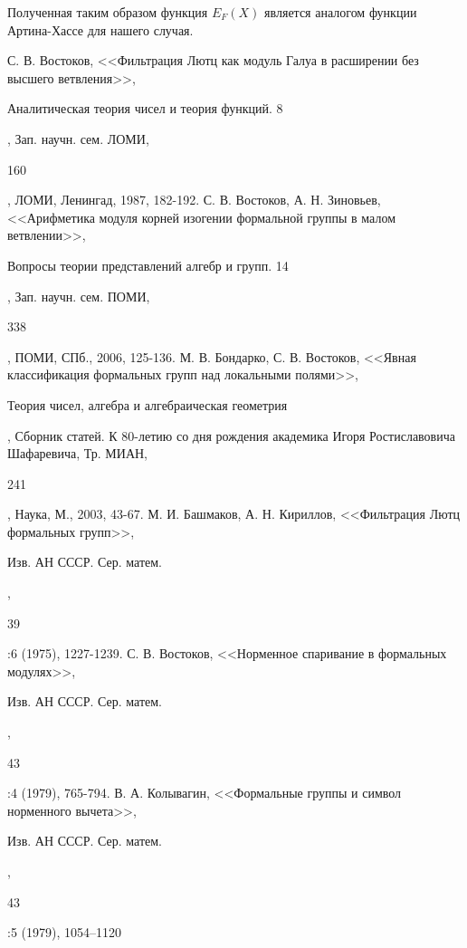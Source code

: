 \documentclass[a4paper]{article}
\begin{document}
Полученная таким образом функция $E_F(X)$ является аналогом функции Артина-Хассе для нашего случая.


\pagebreak 


\begin{thebibliography}{3}   
    С. В. Востоков, <<Фильтрация Лютц как модуль Галуа в расширении без высшего ветвления>>, \begin{it}Аналитическая теория чисел и теория функций. 8\end{it}, Зап. научн. сем. ЛОМИ, \begin{bf}160\end{bf}, ЛОМИ, Ленингад, 1987, 182-192.           
    С. В. Востоков, А. Н. Зиновьев, <<Арифметика модуля корней изогении формальной группы в малом ветвлении>>, \begin{it}Вопросы теории представлений алгебр и групп. 14\end{it}, Зап. научн. сем. ПОМИ, \begin{bf}338\end{bf}, ПОМИ, СПб., 2006, 125-136.           
    М. В. Бондарко, С. В. Востоков, <<Явная классификация формальных групп над локальными полями>>, \begin{it}Теория чисел, алгебра и алгебраическая геометрия\end{it}, Сборник статей. К 80-летию со дня рождения академика Игоря Ростиславовича Шафаревича, Тр. МИАН, \begin{bf}241\end{bf}, Наука, М., 2003, 43-67.
    М. И. Башмаков, А. Н. Кириллов, <<Фильтрация Лютц формальных групп>>, \begin{it}Изв. АН СССР. Сер. матем.\end{it}, \begin{bf}39\end{bf}:6 (1975), 1227-1239.
    С. В. Востоков, <<Норменное спаривание в формальных модулях>>, \begin{it}Изв. АН СССР. Сер. матем.\end{it}, \begin{bf}43\end{bf}:4 (1979), 765-794.
    В. А. Колывагин, <<Формальные группы и символ норменного вычета>>, \begin{it}Изв. АН СССР. Сер. матем.\end{it}, \begin{bf}43\end{bf}:5 (1979), 1054–1120

\end{thebibliography}  
\end{document}
